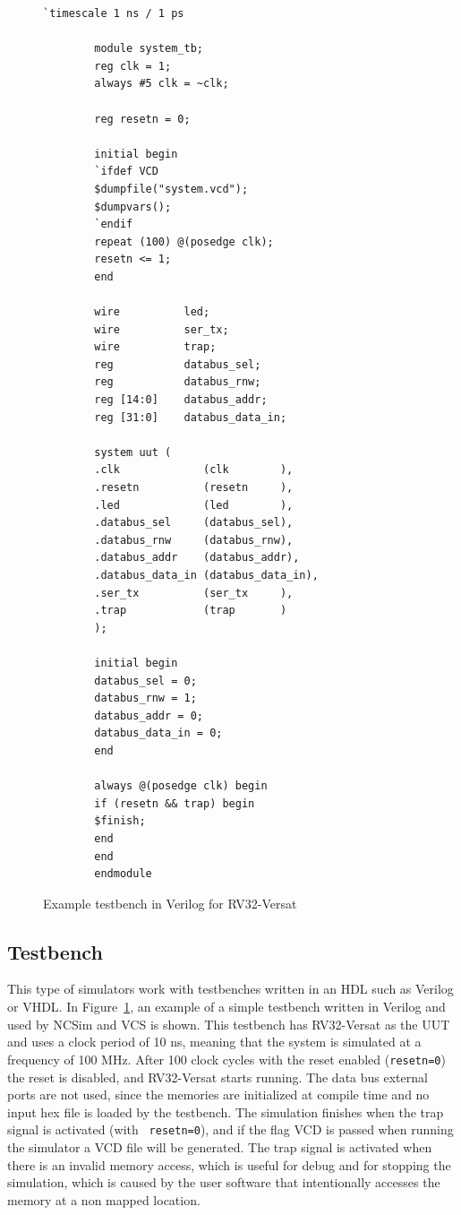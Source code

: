 \documentclass[conference]{IEEEtran}
\begin{document}
\lstset{language=verilog}
\lstset{basicstyle=\scriptsize}
\begin{figure}[!htb]
	\begin{minipage}{\linewidth}
		\begin{lstlisting}[frame=single]
		`timescale 1 ns / 1 ps
		
		module system_tb;
		reg clk = 1;
		always #5 clk = ~clk;
		
		reg resetn = 0;
		
		initial begin
		`ifdef VCD
		$dumpfile("system.vcd");
		$dumpvars();
		`endif
		repeat (100) @(posedge clk);
		resetn <= 1;
		end
		
		wire          led;
		wire          ser_tx;
		wire          trap;
		reg           databus_sel;
		reg           databus_rnw;
		reg [14:0]    databus_addr;
		reg [31:0]    databus_data_in;
		
		system uut (
		.clk             (clk        ),
		.resetn          (resetn     ),
		.led             (led        ),
		.databus_sel     (databus_sel),
		.databus_rnw     (databus_rnw),
		.databus_addr    (databus_addr),
		.databus_data_in (databus_data_in),
		.ser_tx          (ser_tx     ),
		.trap            (trap       )
		);
		
		initial begin
		databus_sel = 0;
		databus_rnw = 1;
		databus_addr = 0;
		databus_data_in = 0;
		end
		
		always @(posedge clk) begin
		if (resetn && trap) begin
		$finish;
		end
		end
		endmodule
		\end{lstlisting}
	\end{minipage}
	\caption{Example testbench in Verilog for RV32-Versat}
	\label{fig:tb_verilog}
\end{figure}
\lstset{basicstyle=\normalsize}

\subsection{Testbench}
\label{section:tb}

This type of simulators work with testbenches written in an \ac{HDL} such as
Verilog or VHDL. In Figure~\ref{fig:tb_verilog}, an example of a simple
testbench written in Verilog and used by NCSim and VCS is shown. This testbench
has RV32-Versat as the \ac{UUT} and uses a clock period of 10 ns, meaning that
the system is simulated at a frequency of 100 MHz. After 100 clock cycles with
the reset enabled ({\tt resetn=0}) the reset is disabled, and RV32-Versat starts
running. The data bus external ports are not used, since the memories are
initialized at compile time and no input hex file is loaded by the
testbench. The simulation finishes when the trap signal is activated (with {\tt
	resetn=0}), and if the flag VCD is passed when running the simulator a \ac{VCD}
file will be generated. The trap signal is activated when there is an invalid
memory access, which is useful for debug and for stopping the simulation, which
is caused by the user software that intentionally accesses the memory at a non
mapped location.
\end{document}

